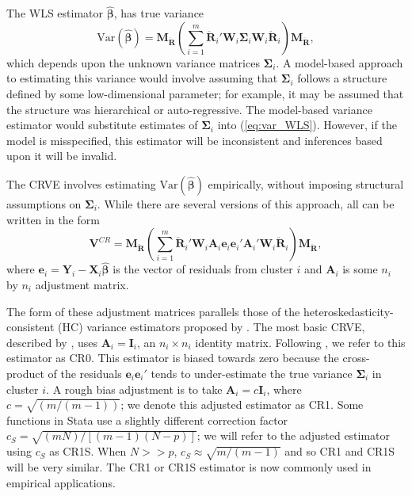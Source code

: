\documentclass[draft]{ectaart}\usepackage[]{graphicx}\usepackage[]{color}
\newcommand{\Var}{\text{Var}}
\newcommand{\bm}{\mathbf}
\newcommand{\bs}{\boldsymbol}
\begin{document}
The WLS estimator $\bs{\hat\beta}$, has true variance
\begin{equation}
\label{eq:var_WLS}
\Var\left(\bs{\hat\beta}\right) = \bm{M_{\ddot{R}}}\left(\sum_{i=1}^m \bm{\ddot{R}}_i' \bm{W}_i \bs\Sigma_i \bm{W}_i\bm{\ddot{R}}_i\right) \bm{M_{\ddot{R}}},
\end{equation}
which depends upon the unknown variance matrices $\bs\Sigma_i$. 
A model-based approach to estimating this variance would involve assuming that $\bm\Sigma_i$ follows a structure defined by some low-dimensional parameter; for example, it may be assumed that the structure was hierarchical or auto-regressive. 
The model-based variance estimator would substitute estimates of $\bs\Sigma_i$ into (\ref{eq:var_WLS}).
However, if the model is misspecified, this estimator will be inconsistent and inferences based upon it will be invalid.

The CRVE involves estimating $\Var\left(\bs{\hat\beta}\right)$ empirically, without imposing structural assumptions on $\bs\Sigma_i$. 
While there are several versions of this approach, all can be written in the form
\begin{equation}
\label{eq:V_small}
\bm{V}^{CR} = \bm{M_{\ddot{R}}}\left(\sum_{i=1}^m \bm{\ddot{R}}_i'\bm{W}_i \bm{A}_i \bm{e}_i \bm{e}_i' \bm{A}_i' \bm{W}_i \bm{\ddot{R}}_i\right) \bm{M_{\ddot{R}}},
\end{equation}
where $\bm{e}_i = \bm{Y}_i - \bm{X}_i \bs{\hat\beta}$ is the vector of residuals from cluster $i$ and $\bm{A}_i$ is some $n_i$ by $n_i$ adjustment matrix. 

The form of these adjustment matrices parallels those of the heteroskedasticity-consistent (HC) variance estimators proposed by \citet*{MacKinnon1985some}. 
The most basic CRVE, described by \citet{Liang1986longitudinal}, uses $\bm{A}_i = \bm{I}_i$, an $n_i \times n_i$ identity matrix. 
Following \citet{Cameron2015practitioners}, we refer to this estimator as CR0. 
This estimator is biased towards zero because the cross-product of the residuals $\bm{e}_i \bm{e}_i'$ tends to under-estimate the true variance $\bs\Sigma_i$ in cluster $i$.
A rough bias adjustment is to take $\bm{A}_i = c\bm{I}_i$, where $c = \sqrt{(m/(m-1))}$; we denote this adjusted estimator as CR1. Some functions in Stata use a slightly different correction factor $c_S = \sqrt{(m N)/[(m - 1)(N - p)]}$; we will refer to the adjusted estimator using $c_S$ as CR1S. When $N >> p$, $c_S \approx \sqrt{m/(m-1)}$ and so CR1 and CR1S will be very similar.
The CR1 or CR1S estimator is now commonly used in empirical applications.
\end{document}
